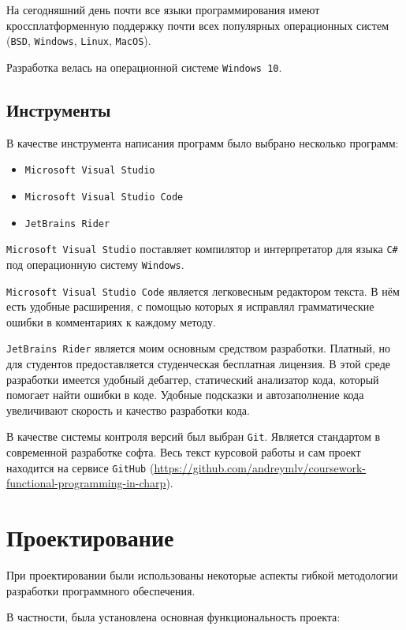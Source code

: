 На сегодняшний день почти все языки программирования имеют кроссплатформенную поддержку почти всех популярных операционных систем (\texttt{BSD}, \texttt{Windows}, \texttt{Linux}, \texttt{MacOS}).

Разработка велась на операционной системе \texttt{Windows 10}.

\subsection{Инструменты}

В качестве инструмента написания программ было выбрано несколько программ:

\begin{itemize}
	\item \texttt{Microsoft Visual Studio}
	\item \texttt{Microsoft Visual Studio Code}
	\item \texttt{JetBrains Rider}
\end{itemize}

\texttt{Microsoft Visual Studio} поставляет компилятор и интерпретатор для языка \texttt{C\#} под операционную систему \texttt{Windows}.

\texttt{Microsoft Visual Studio Code} является легковесным редактором текста.
В нём есть удобные расширения, с помощью которых я исправлял грамматические ошибки в комментариях к каждому методу.

\texttt{JetBrains Rider} является моим основным средством разработки.
Платный, но для студентов предоставляется студенческая бесплатная лицензия.
В этой среде разработки имеется удобный дебаггер, статический анализатор кода, который помогает найти ошибки в коде.
Удобные подсказки и автозаполнение кода увеличивают скорость и качество разработки кода.

В качестве системы контроля версий был выбран \texttt{Git}.
Является стандартом в современной разработке софта.
Весь текст курсовой работы и сам проект находится на сервисе \texttt{GitHub} (\url{https://github.com/andreymlv/coursework-functional-programming-in-charp}).

\newpage
\section{Проектирование}

При проектировании были использованы некоторые аспекты гибкой методологии разработки программного обеспечения.

В частности, была установлена основная функциональность проекта:

